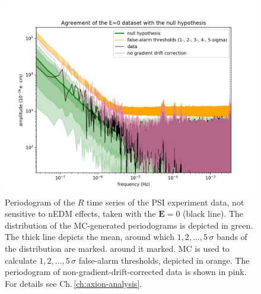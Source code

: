 \begin{figure}[h!]
  \centering
  \includegraphics[width=\linewidth]{gfx/axions/E0_detection_and_no_GDC.png}
  \caption{Periodogram of the $R$ time series of the PSI experiment data, not sensitive to nEDM effects, taken with the $\mathbf{E} = 0$ (black line).
  The distribution of the MC-generated periodograms is depicted in green. The thick line depicts the mean, around which $1,2,…,5\,\sigma$ bands of the distribution are marked. around it marked. MC is used to calculate $1,2,…,5\,\sigma$ false-alarm thresholds, depicted in orange.
  The periodogram of non-gradient-drift-corrected data is shown in pink. For details see Ch.\,\ref{ch:axion-analysis}.}\label{fig:app_E0_periodogram}
\end{figure}

